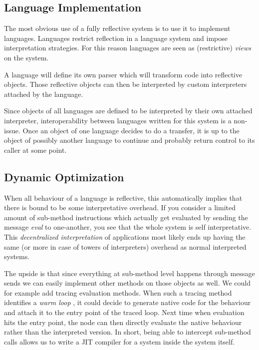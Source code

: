 \documentclass{article}
\begin{document}
\subsection{Language Implementation}
The most obvious use of a fully reflective system is to use it to
implement languages. Languages restrict reflection in a language
system and impose interpretation strategies. For this reason languages
are seen as (restrictive) \emph{views} on the system.

A language will define its own parser which will transform code into
reflective objects. Those reflective objects can then be interpreted
by custom interpreters attached by the language.

Since objects of all languages are defined to be interpreted by their
own attached interpreter, interoperability between languages written
for this system is a non-issue. Once an object of one language decides
to do a transfer, it is up to the object of possibly another language
to continue and probably return control to its caller at some point.

\subsection{Dynamic Optimization\label{sec:dynamicoptimization}}
When all behaviour of a language is reflective, this automatically
implies that there is bound to be some interpretative overhead. If you
consider a limited amount of sub-method instructions which actually
get evaluated by sending the message \emph{eval} to one-another, you
see that the whole system is self interpretative. This
\emph{decentralized interpretation} of applications most likely ends
up having the same (or more in case of towers of interpreters)
overhead as normal interpreted systems.

The upside is that since everything at sub-method level happens
through message sends we can easily implement other methods on those
objects as well. We could for example add tracing evaluation methods.
When such a tracing method identifies a \emph{warm loop} \cite{JIT},
it could decide to generate native code for the behaviour and attach
it to the entry point of the traced loop. Next time when evaluation
hits the entry point, the node can then directly evaluate the native
behaviour rather than the interpreted version. In short, being able to
intercept sub-method calls allows us to write a JIT compiler for a
system inside the system itself.
\end{document}
